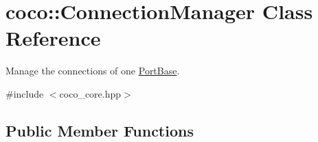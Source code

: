 \hypertarget{classcoco_1_1_connection_manager}{}\section{coco\+:\+:Connection\+Manager Class Reference}
\label{classcoco_1_1_connection_manager}


Manage the connections of one \hyperlink{classcoco_1_1_port_base}{Port\+Base}.  




{\ttfamily \#include $<$coco\+\_\+core.\+hpp$>$}

\subsection*{Public Member Functions}
